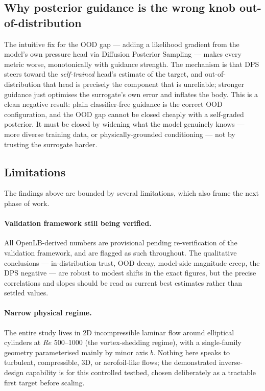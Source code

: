 \subsection{Why posterior guidance is the wrong knob out-of-distribution}

The intuitive fix for the OOD gap --- adding a likelihood gradient from the model's own pressure head
via Diffusion Posterior Sampling \cite{chung2023dps} --- makes every metric worse, monotonically with
guidance strength. The mechanism is that DPS steers toward the \emph{self-trained} head's estimate of
the target, and out-of-distribution that head is precisely the component that is unreliable; stronger
guidance just optimises the surrogate's own error and inflates the body. This is a clean negative
result: plain classifier-free guidance is the correct OOD configuration, and the OOD gap cannot be
closed cheaply with a self-graded posterior. It must be closed by widening what the model genuinely
knows --- more diverse training data, or physically-grounded conditioning --- not by trusting the
surrogate harder.

\subsection{Limitations}

The findings above are bounded by several limitations, which also frame the next phase of work.

\paragraph{Validation framework still being verified.} All OpenLB-derived numbers are provisional
pending re-verification of the validation framework, and are flagged as such throughout. The
qualitative conclusions --- in-distribution trust, OOD decay, model-side magnitude creep, the DPS
negative --- are robust to modest shifts in the exact figures, but the precise correlations and slopes
should be read as current best estimates rather than settled values.

\paragraph{Narrow physical regime.} The entire study lives in 2D incompressible laminar flow around
elliptical cylinders at $Re$ 500--1000 (the vortex-shedding regime), with a single-family geometry
parameterised mainly by minor axis $b$. Nothing here speaks to turbulent, compressible, 3D, or
aerofoil-like flows; the demonstrated inverse-design capability is for this controlled testbed, chosen
deliberately as a tractable first target before scaling.

